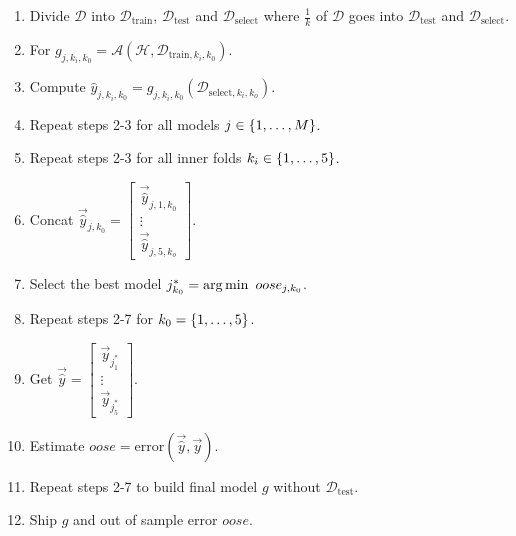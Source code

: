 \documentclass[12pt]{article}
\begin{document}
\begin{enumerate}
\begin{enumerate} 
\item Divide $\mathcal{D}$ into $\mathcal{D}_{\text{train}}$, $\mathcal{D}_{\text{test}}$ and $\mathcal{D}_{\text{select}}$ where $\frac{1}{k}$ of $\mathcal{D}$ goes into $\mathcal{D}_{\text{test}}$ and $\mathcal{D}_{\text{select}}$. 
\item For $g_{j, k_i, k_0} = \mathcal{A}(\mathcal{H}, \mathcal{D}_{\text{train}, k_i, k_0})$.
\item Compute $\hat{y}_{j, k_i, k_0} = g_{j, k_i, k_0}(\mathcal{D}_{\text{select}, k_i, k_o})$.
\item Repeat steps 2-3 for all models $j \in \left\{1,\dots,M\right\}$.
\item Repeat steps 2-3 for all inner folds $k_i \in \left\{1,\dots,5\right\}$.
\item Concat $\vec{\hat{y}}_{j, k_0} = \begin{bmatrix} \vec{\hat{y}}_{j, 1, k_0} \\ \vdots \\ \vec{\hat{y}}_{j, 5, k_o} \end{bmatrix}$. 
\item Select the best model $j^*_{k_0} = \operatorname*{arg\,min~} {oose_{j, k_0}}$. 
\item Repeat steps 2-7 for $k_0 = \left\{1,\dots, 5\right\}$. 
\item Get $\vec{\hat{y}} = \begin{bmatrix} \vec{y}_{j^*_1} \\ \vdots \\ \vec{y}_{j^*_5} \end{bmatrix} $. 
\item Estimate $oose = \text{error}(\vec{\hat{y}}, \vec{y})$. 
\item Repeat steps 2-7 to build final model $g$ without $\mathcal{D}_{\text{test}}$. 
\item Ship $g$ and out of sample error $oose$. 
\end{enumerate}


\end{enumerate}
\end{document}
